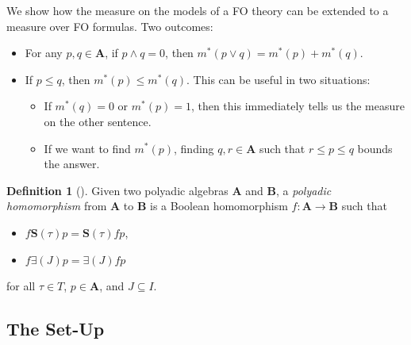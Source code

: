 \documentclass{article}
\theoremstyle{definition}
\newtheorem{definition}{Definition}
\theoremstyle{remark}
\begin{document}
We show how the measure on the models of a FO theory can be extended to a
measure over FO formulas. Two outcomes:
\begin{itemize}
\item For any $p, q \in \mathbf{A}$, if $p \land q = 0$, then $m^*(p \lor q) =
  m^*(p) + m^*(q)$.
\item If $p \le q$, then $m^*(p) \le m^*(q)$. This can be useful in two
  situations:
  \begin{itemize}
  \item If $m^*(q) = 0$ or $m^*(p) = 1$, then this immediately tells us the
    measure on the other sentence.
  \item If we want to find $m^*(p)$, finding $q, r \in \mathbf{A}$ such that $r
    \le p \le q$ bounds the answer.
  \end{itemize}
\end{itemize}

\begin{definition}[\cite{halmos2016algebraic}]
  Given two polyadic algebras $\mathbf{A}$ and $\mathbf{B}$, a \emph{polyadic
    homomorphism} from $\mathbf{A}$ to $\mathbf{B}$ is a Boolean homomorphism
  $f\colon \mathbf{A} \to \mathbf{B}$ such that
  \begin{itemize}
  \item $f\mathbf{S}(\tau)p = \mathbf{S}(\tau)fp$,
  \item $f\bm\exists(J)p = \bm\exists(J)fp$
  \end{itemize}
  for all $\tau \in T$, $p \in \mathbf{A}$, and $J \subseteq I$.
\end{definition}


\subsection{The Set-Up}

\end{document}
